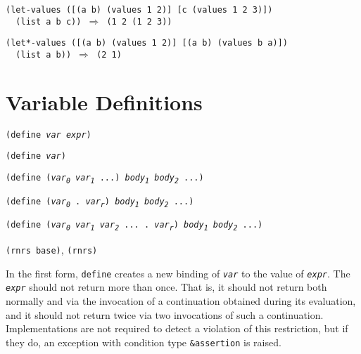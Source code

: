 \begin{alltt}
(let-values ([(a b) (values 1 2)] [c (values 1 2 3)])
  (list a b c)) \(\Rightarrow\) (1 2 (1 2 3))

(let*-values ([(a b) (values 1 2)] [(a b) (values b a)])
  (list a b)) \(\Rightarrow\) (2 1)
\end{alltt}

\section{\label{binding_g94}\label{binding_h6}Variable Definitions\label{binding_SECTDEFINITIONS}}


\begin{description}

\label{binding_s24}\item[syntax] \texttt{(define \textit{var} \textit{expr})}



\item[syntax] \texttt{(define \textit{var})}



\item[syntax] \texttt{(define (\textit{var\textsubscript{0}} \textit{var\textsubscript{1}} ...) \textit{body\textsubscript{1}} \textit{body\textsubscript{2}} ...)}



\item[syntax] \texttt{(define (\textit{var\textsubscript{0}} . \textit{var\textsubscript{r}}) \textit{body\textsubscript{1}} \textit{body\textsubscript{2}} ...)}



\item[syntax] \texttt{(define (\textit{var\textsubscript{0}} \textit{var\textsubscript{1}} \textit{var\textsubscript{2}} ... . \textit{var\textsubscript{r}}) \textit{body\textsubscript{1}} \textit{body\textsubscript{2}} ...)}



\item[libraries] \texttt{(rnrs base)}, \texttt{(rnrs)}
\end{description}


In the first form, \texttt{define} creates a new binding of \texttt{\textit{var}} to
the value of \texttt{\textit{expr}}.
The \texttt{\textit{expr}} should not return more than once.
That is, it should not return both normally and via the invocation of a
continuation obtained during its evaluation, and it should not return
twice via two invocations of such a continuation.
Implementations are not required to detect a violation of this restriction,
but if they do, an exception with condition type \texttt{\&{}assertion} is
raised.


